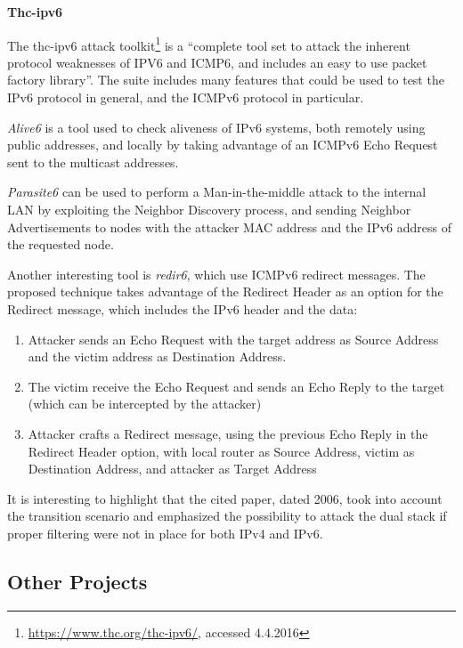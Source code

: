 \documentclass[12pt]{article}
\begin{document}
\textbf{Thc-ipv6}

The thc-ipv6 attack toolkit\footnote{\url{https://www.thc.org/thc-ipv6/}, accessed 4.4.2016} is a ``complete tool set to attack the inherent protocol weaknesses of IPV6 and ICMP6, and includes an easy to use packet factory library''. The suite includes many features that could be used to test the IPv6 protocol in general, and the ICMPv6 protocol in particular\cite{thc}.

\textit{Alive6} is a tool used to check aliveness of IPv6 systems, both remotely using public addresses, and locally by taking advantage of an ICMPv6 Echo Request sent to the multicast addresses\cite{thc}.

\textit{Parasite6} can be used to perform a Man-in-the-middle attack to the internal LAN by exploiting the Neighbor Discovery process, and sending Neighbor Advertisements to nodes with the attacker MAC address and the IPv6 address of the requested node\cite{thc}.

Another interesting tool is \textit{redir6}, which use ICMPv6 redirect messages. The proposed technique takes advantage of the Redirect Header as an option for the Redirect message, which includes the IPv6 header and the data\cite{thc}:
\vspace{-15pt}
\begin{enumerate}[noitemsep,topsep=0pt,partopsep=0pt]
 \item Attacker sends an Echo Request with the target address as Source Address and the victim address as Destination Address.
 \item The victim receive the Echo Request and sends an Echo Reply to the target (which can be intercepted by the attacker)
 \item Attacker crafts a Redirect message, using the previous Echo Reply in the Redirect Header option, with local router as Source Address, victim as Destination Address, and attacker as Target Address
\end{enumerate}

It is interesting to highlight that the cited paper, dated 2006, took into account the transition scenario and emphasized the possibility to attack the dual stack if proper filtering were not in place for both IPv4 and IPv6.


\subsection{Other Projects}
\label{sub:otherProj}
\end{document}
